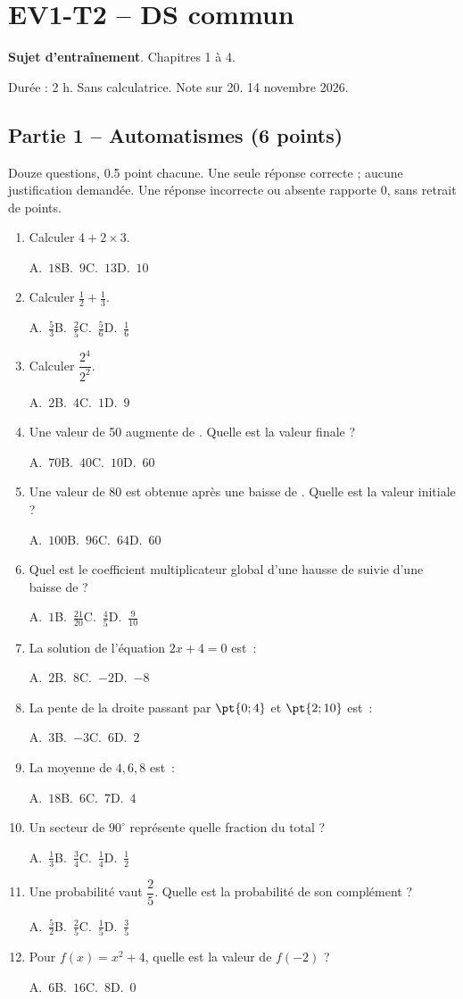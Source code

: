 \mxnewpage\section*{EV1-T2 -- DS commun}\label{EV1-T2}
\textbf{Sujet d’entraînement}. Chapitres 1 à 4.\par Durée : 2 h. Sans calculatrice. Note sur 20. 14 novembre 2026.
\subsection*{Partie 1 -- Automatismes (6 points)}
Douze questions, \num{0,5} point chacune. Une seule réponse correcte ; aucune justification demandée. Une réponse incorrecte ou absente rapporte 0, sans retrait de points.
\begin{enumerate}
\item Calculer $4+2\times3$.\par A.~$18$\quad B.~$9$\quad C.~$13$\quad D.~$10$
\item Calculer $\frac12+\frac13$.\par A.~$\frac{5}{3}$\quad B.~$\frac{2}{5}$\quad C.~$\frac{5}{6}$\quad D.~$\frac{1}{6}$
\item Calculer $\dfrac{2^4}{2^{2}}$.\par A.~$2$\quad B.~$4$\quad C.~$1$\quad D.~$9$
\item Une valeur de 50 augmente de . Quelle est la valeur finale ?\par A.~$70$\quad B.~$40$\quad C.~$10$\quad D.~$60$
\item Une valeur de 80 est obtenue après une baisse de . Quelle est la valeur initiale ?\par A.~$100$\quad B.~$96$\quad C.~$64$\quad D.~$60$
\item Quel est le coefficient multiplicateur global d'une hausse de  suivie d'une baisse de  ?\par A.~$1$\quad B.~$\frac{21}{20}$\quad C.~$\frac{4}{5}$\quad D.~$\frac{9}{10}$
\item La solution de l'équation $2x+4=0$ est~:\par A.~$2$\quad B.~$8$\quad C.~$-2$\quad D.~$-8$
\item La pente de la droite passant par $\pt{0;4}$ et $\pt{2;10}$ est~:\par A.~$3$\quad B.~$-3$\quad C.~$6$\quad D.~$2$
\item La moyenne de $4, 6, 8$ est~:\par A.~$18$\quad B.~$6$\quad C.~$7$\quad D.~$4$
\item Un secteur de $90^\circ$ représente quelle fraction du total ?\par A.~$\frac{1}{3}$\quad B.~$\frac{3}{4}$\quad C.~$\frac{1}{4}$\quad D.~$\frac{1}{2}$
\item Une probabilité vaut $\dfrac{2}{5}$. Quelle est la probabilité de son complément ?\par A.~$\frac{5}{2}$\quad B.~$\frac{2}{5}$\quad C.~$\frac{1}{5}$\quad D.~$\frac{3}{5}$
\item Pour $f(x)=x^2+4$, quelle est la valeur de $f(-2)$ ?\par A.~$6$\quad B.~$16$\quad C.~$8$\quad D.~$0$
\end{enumerate}
